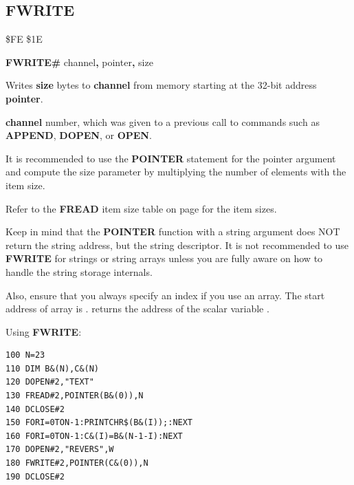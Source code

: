 \subsection{FWRITE}
\begin{description}[leftmargin=2cm,style=nextline]
\item [Token:] \$FE \$1E
\item [Format:] {\bf FWRITE\#} channel{\bf,} pointer{\bf,} size
\item [Usage:] Writes {\bf size} bytes to {\bf channel} from memory
               starting at the 32-bit address {\bf pointer}.

               {\bf channel} number, which was given to a previous
               call to commands such as {\bf APPEND}, {\bf DOPEN}, or {\bf OPEN}.

               It is recommended to use the {\bf POINTER} statement
               for the pointer argument and compute the size parameter
               by multiplying the number of elements with the item size.

               Refer to the {\bf FREAD} item size table on page \pageref{freadtable}
               for the item sizes.

Keep in mind that the {\bf POINTER} function with a string argument
does NOT return the string address, but the string descriptor.
It is not recommended to use {\bf FWRITE} for strings or string arrays
unless you are fully aware on how to handle the string storage internals.


Also, ensure that you always specify an index if you use an array.
The start address of array  is .
 returns the address of the scalar variable .


\item [Example:] Using {\bf FWRITE}:
\begin{tcolorbox}[colback=black,coltext=white]
\verbatimfont{\codefont}
\begin{verbatim}
100 N=23
110 DIM B&(N),C&(N)
120 DOPEN#2,"TEXT"
130 FREAD#2,POINTER(B&(0)),N
140 DCLOSE#2
150 FORI=0TON-1:PRINTCHR$(B&(I));:NEXT
160 FORI=0TON-1:C&(I)=B&(N-1-I):NEXT
170 DOPEN#2,"REVERS",W
180 FWRITE#2,POINTER(C&(0)),N
190 DCLOSE#2
\end{verbatim}
\end{tcolorbox}
\end{description}


